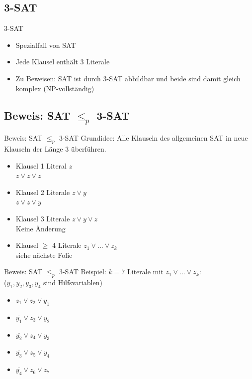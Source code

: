 \documentclass[12pt,donthandout,notes=dontshow,xcolor=table]{beamer}
\begin{document}
\subsection{3-SAT}
\begin{frame}{3-SAT}
\begin{itemize}
\item Spezialfall von SAT
\item Jede Klausel enthält 3 Literale
\item Zu Beweisen: SAT ist durch 3-SAT abbildbar und beide sind damit gleich komplex (NP-vollständig)
\end{itemize}
\end{frame}

\subsection{Beweis: SAT $\leq_p$ 3-SAT}
\begin{frame}{Beweis: SAT \(\leq_p\) 3-SAT}
Grundidee: Alle Klauseln des allgemeinen SAT in neue Klauseln der Länge 3 überführen.
\begin{itemize}
\item Klausel 1 Literal  \(z\) \\ \textrightarrow \(z \vee z \vee z\)
\item Klausel 2 Literale \(z \vee y\) \\ \textrightarrow \(z \vee z \vee y\)
\item Klausel 3 Literale \(z \vee y \vee z\) \\ \textrightarrow Keine Änderung
\item Klausel \(\ge\) 4 Literale \(z_1 \vee ... \vee z_k\) \\ \textrightarrow siehe nächste Folie
\end{itemize}
\end{frame}

\begin{frame}{Beweis: SAT \(\leq_p\) 3-SAT}
Beispiel: \(k = 7\) Literale mit \(z_1 \vee ... \vee z_k\):\\
(\(y_1,y_2,y_3,y_4\) sind Hilfsvariablen)
\begin{itemize}
\item \(z_1 \vee z_2 \vee y_1\)
\item \(\overline{y_1} \vee z_3 \vee y_2\)
\item \(\overline{y_2} \vee z_4 \vee y_3\)
\item \(\overline{y_3} \vee z_5 \vee y_4\)
\item \(\overline{y_4} \vee z_6 \vee z_7\)\\
\end{itemize}
\end{frame}
\end{document}
